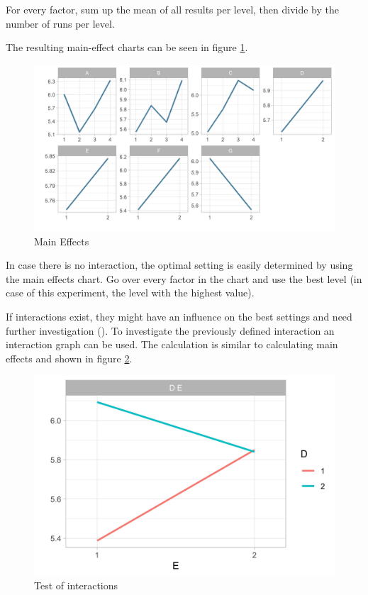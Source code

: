 For every factor, sum up the mean of all results per level, then divide by the number of runs per level.


The resulting main-effect charts can be seen in figure \ref{figure:taguchi:main_effects}.
\begin{figure}[ht] 
	\label{figure:taguchi:main_effects}
	\includegraphics[width=1\linewidth]{simulations/taguchi/plots/main_effects}
	\caption{Main Effects}
\end{figure}


In case there is no interaction, the optimal setting is easily determined by using the main effects chart. Go over every factor in the chart and use the best level (in case of this experiment, the level with the highest value). 

If interactions exist, they might have an influence on the best settings and need further investigation (\cite{yang_design_2009}). To investigate the previously defined interaction an interaction graph can be used. The calculation is similar to calculating main effects and shown in figure \ref{figure:taguchi:test_of_interaction}.


\begin{figure}[ht] 
	\label{figure:taguchi:test_of_interaction}
	\centering
	\includegraphics[width=0.4\linewidth]{simulations/taguchi/plots/test_of_interaction}
	\caption{Test of interactions}
\end{figure}

